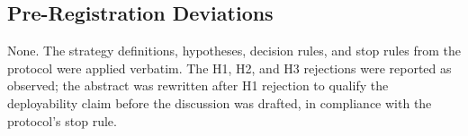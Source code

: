 \subsection{Pre-Registration Deviations}

None. The strategy definitions, hypotheses, decision rules, and stop
rules from the protocol were applied verbatim. The H1, H2, and H3
rejections were reported as observed; the abstract was rewritten
after H1 rejection to qualify the deployability claim before the
discussion was drafted, in compliance with the protocol's stop rule.
